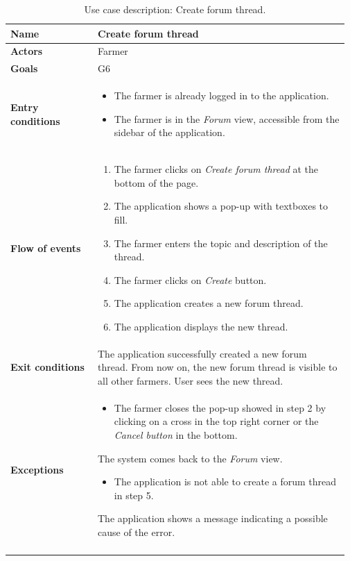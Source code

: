 \begin{longtable}{@{}p{0.25\linewidth} p{0.72\linewidth}@{}}
\toprule
	\textbf{Name}               & Create forum thread\\
	\endfirsthead
	\midrule
	\textbf{Actors}             & Farmer\\
	\midrule
	\textbf{Goals}              & G6 \\
	\midrule
	
	\textbf{Entry conditions}   & \begin{itemize}[leftmargin=.4cm,noitemsep,topsep=0pt,before=\vspace{-3mm},after=\vspace{-4mm}]
	    \item The farmer is already logged in to the application.
	    \item The farmer is in the \textit{Forum} view, accessible from the sidebar of the application.
	\end{itemize}\\
	\midrule
	
	\textbf{Flow of events}     & \begin{enumerate}[leftmargin=.4cm,noitemsep,topsep=0pt,before=\vspace{-3mm},after=\vspace{-4mm}]
	    \item The farmer clicks on \textit{Create forum thread} at the bottom of the page.
	    \item The application shows a pop-up with textboxes to fill.
	    \item The farmer enters the topic and description of the thread.
	    \item The farmer clicks on \textit{Create} button.
	    \item The application creates a new forum thread.
	    \item The application displays the new thread.
	\end{enumerate}\\
	\midrule
	\textbf{Exit conditions}    & The application successfully created a new forum thread. From now on, the new forum thread is visible to all other farmers. User sees the new thread. \\
	\midrule
	
	\textbf{Exceptions}         & \begin{itemize}[leftmargin=.4cm,noitemsep,topsep=0pt,before=\vspace{-3mm}]
	   \item The farmer closes the pop-up showed in step 2 by clicking on a cross in the top right corner or the \textit{Cancel button} in the bottom.
	\end{itemize}
    The system comes back to the \textit{Forum} view.
    \begin{itemize}[leftmargin=.4cm,noitemsep,topsep=0pt]
	   \item The application is not able to create a forum thread in step 5. 
	\end{itemize}
	The application shows a message indicating a possible cause of the error.
    \\\bottomrule
	\caption{Use case description: Create forum thread.} 
\end{longtable}

